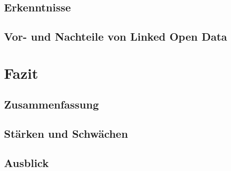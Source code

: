 \documentclass[a4paper, 11pt]{article}
\begin{document}
\subsection{Erkenntnisse}
\subsection{Vor- und Nachteile von Linked Open Data}
\newpage
\section{Fazit}
\subsection{Zusammenfassung}
\subsection{Stärken und Schwächen}
\subsection{Ausblick}

  
\end{document}
